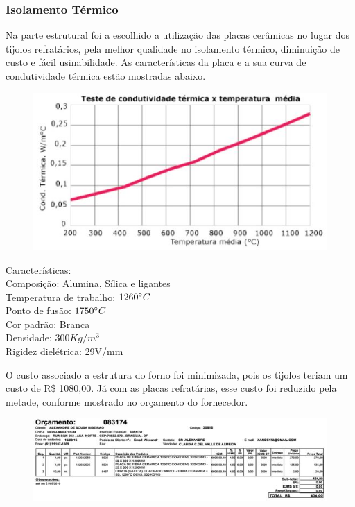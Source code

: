 \subsubsection{Isolamento Térmico}
Na parte estrutural foi a escolhido a utilização das placas cerâmicas no lugar dos tijolos refratários, pela melhor qualidade no isolamento térmico, diminuição de custo e fácil usinabilidade. As características da placa e a sua curva de condutividade térmica estão mostradas abaixo.

\begin{figure}[h]
	\centering
	\label{on_off}
	\includegraphics[keepaspectratio=true,scale=0.8]{figuras/condutividade.JPG}
\end{figure}

Características:
\\Composição: Alumina, Sílica e ligantes
\\Temperatura de trabalho: $1260\degree C$
\\Ponto de fusão: $1750\degree C$
\\Cor padrão: Branca
\\Densidade: $300 Kg/m^{3}$
\\Rigidez dielétrica: 29V/mm

O custo associado a estrutura do forno foi minimizada, pois os tijolos teriam um custo de R\$ 1080,00. Já com as placas refratárias, esse custo foi reduzido pela metade, conforme mostrado no orçamento do fornecedor.  

\begin{figure}[h]
	\centering
	\label{on_off}
	\includegraphics[keepaspectratio=true,scale=0.8]{figuras/custototal.JPG}
\end{figure}


